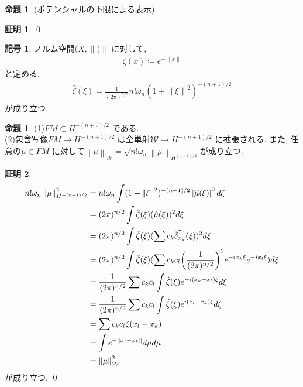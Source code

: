 \documentclass[10pt, fleqn, label-section=none]{bxjsarticle}
\theoremstyle{definition}
\newtheorem{prop}[dfn]{命題}
\newtheorem{notation}[dfn]{記号}
\newtheorem*{pf*}{証明}
\newcommand{\paren}[1]{\mleft( #1\mright )}
\newcommand{\abs}[1]{\left|#1\right|}
\newcommand{\norm}[1]{\left\|#1\right\|}
\renewcommand{\;}{\, ; \,}
\begin{document}
\begin{prop}(ポテンシャルの下限による表示). 

\end{prop}
\begin{pf*}

\qed
\end{pf*}



\begin{notation}ノルム空間$(X, \norm )$ に対して, 
\begin{align*} \zeta(x) \coloneqq e^{-\norm{x}} \end{align*}
と定める. 
\begin{align*} \hat \zeta (\xi) = \frac{1}{(2\pi)^{n/2}} n! \omega_n (1 + \norm \xi ^2)^{-(n+1)/2} \end{align*}
が成り立つ. 
\end{notation}

\begin{prop}(1)$FM \subset  H^{-(n+1)/2} $ である. \\
(2)包含写像$FM \rightarrow H^{-(n+1)/2} $ は全単射$\mathcal W \rightarrow H^{-(n+1)/ 2}$ に拡張される. また, 任意の$\mu \in FM$ に対して$\norm{\mu}_{\mathcal W} = \sqrt{n ! \omega_n} \norm{\mu}_{H^{(n+1)/2}}$ が成り立つ. 

\end{prop}
\begin{pf*}



\begin{align*} 
n! \omega _n \norm{\mu}^2_{H^{-(n+1)/2}} 
&= n! \omega _n \int (1 + \norm \xi ^2) ^{-(n+1)/2} \abs{\widehat \mu (\xi)}^2 d \xi
\\&= (2 \pi )^{n/2} \int \hat \zeta (\xi) (\hat \mu (\xi))^2 d\xi 
\\&= (2 \pi )^{n/2} \int \hat \zeta (\xi) (\sum c_k \widehat{\delta_{x_k}} (\xi))^2 d\xi 
\\&= (2 \pi )^{n/2} \int \hat \zeta (\xi) (\sum c_k c_l  \paren{\frac{1}{(2\pi)^{n/2}}}^2 e^{- i x_k \xi} e^{ -i x_l \xi }  ) d\xi 
\\&= \frac{1}{(2 \pi )^{n/2}} \sum c_k c_l  \int \hat \zeta (\xi)  e^{- i (x_k - x_l) \xi}   d\xi 
\\&=\frac{1}{(2 \pi )^{n/2}} \sum c_k c_l  \int \hat \zeta (\xi)  e^{i (x_l - x_k) \xi}   d\xi 
\\&=  \sum c_k c_l   \zeta (x_l - x_k)  
\\&= \int e^{-\norm{x_l - x_k}} d\mu d\mu
\\& = \norm{\mu}^2_{\mathcal W}  
\end{align*}
が成り立つ. 
\qed
\end{pf*}
\end{document}
